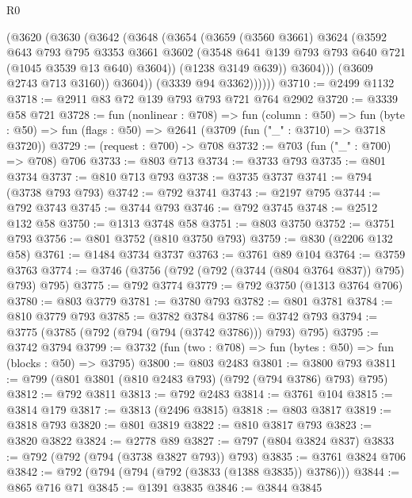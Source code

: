 \begin{lexlean}{R0}
\begin{coremodule}
                (@3620
                  (@3630
                    (@3642
                      (@3648
                        (@3654
                          (@3659
                            (@3560 @3661)
                            @3624
                            (@3592
                              @643
                              @793
                              @795
                              @3353
                              @3661
                              @3602
                              (@3548 @641 @139 @793 @793 @640 @721 (@1045 @3539 @13 @640) @3604))
                            (@1238 @3149 @639))
                          @3604)))
                    (@3609 @2743 @713 @3160))
                  @3604))
              (@3339 @94 @3362))))))
@3710 := @2499 @1132
@3718 := @2911 @83 @72 @139 @793 @793 @721 @764 @2902
@3720 := @3339 @58 @721
@3728 := fun (nonlinear : @708) =>
  fun (column : @50) =>
  fun (byte : @50) => fun (flags : @50) => @2641 (@3709 (fun ("_" : @3710) => @3718 @3720))
@3729 := (request : @700) -> @708
@3732 := @703 (fun ("_" : @700) => @708) @706
@3733 := @803 @713
@3734 := @3733 @793
@3735 := @801 @3734
@3737 := @810 @713 @793
@3738 := @3735 @3737
@3741 := @794 (@3738 @793 @793)
@3742 := @792 @3741
@3743 := @2197 @795
@3744 := @792 @3743
@3745 := @3744 @793
@3746 := @792 @3745
@3748 := @2512 @132 @58
@3750 := @1313 @3748 @58
@3751 := @803 @3750
@3752 := @3751 @793
@3756 := @801 @3752 (@810 @3750 @793)
@3759 := @830 (@2206 @132 @58)
@3761 := @1484 @3734 @3737
@3763 := @3761 @89 @104
@3764 := @3759 @3763
@3774 := @3746 (@3756 (@792 (@792 (@3744 (@804 @3764 @837)) @795) @793) @795)
@3775 := @792 @3774
@3779 := @792 @3750 (@1313 @3764 @706)
@3780 := @803 @3779
@3781 := @3780 @793
@3782 := @801 @3781
@3784 := @810 @3779 @793
@3785 := @3782 @3784
@3786 := @3742 @793
@3794 := @3775 (@3785 (@792 (@794 (@794 (@3742 @3786))) @793) @795)
@3795 := @3742 @3794
@3799 := @3732 (fun (two : @708) => fun (bytes : @50) => fun (blocks : @50) => @3795)
@3800 := @803 @2483
@3801 := @3800 @793
@3811 := @799 (@801 @3801 (@810 @2483 @793) (@792 (@794 @3786) @793) @795)
@3812 := @792 @3811
@3813 := @792 @2483
@3814 := @3761 @104
@3815 := @3814 @179
@3817 := @3813 (@2496 @3815)
@3818 := @803 @3817
@3819 := @3818 @793
@3820 := @801 @3819
@3822 := @810 @3817 @793
@3823 := @3820 @3822
@3824 := @2778 @89
@3827 := @797 (@804 @3824 @837)
@3833 := @792 (@792 (@794 (@3738 @3827 @793)) @793)
@3835 := @3761 @3824 @706
@3842 := @792 (@794 (@794 (@792 (@3833 (@1388 @3835)) @3786)))
@3844 := @865 @716 @71
@3845 := @1391 @3835
@3846 := @3844 @3845

\end{coremodule}
\end{lexlean}

